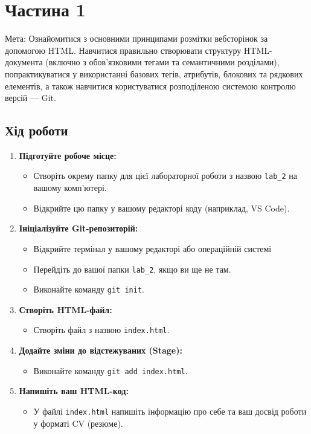 \documentclass[12pt, a4paper]{article}
\begin{document}

\section{Частина 1}
Мета: Ознайомитися з основними принципами розмітки вебсторінок за допомогою HTML. Навчитися правильно створювати структуру HTML-документа (включно з обов'язковими тегами та семантичними розділами), попрактикуватися у використанні базових тегів, атрибутів, блокових та рядкових елементів, а також навчитися користуватися розподіленою системою контролю версій --- Git.
\subsection{Хід роботи}
\begin{enumerate}
	\item \textbf{Підготуйте робоче місце:}
		\begin{itemize}
			\item Створіть окрему папку для цієї лабораторної роботи з назвою \verb|lab_2| на вашому комп'ютері.
			\item Відкрийте цю папку у вашому редакторі коду (наприклад, VS Code).
		\end{itemize}
	\item \textbf{Ініціалізуйте Git-репозиторій:}
		\begin{itemize}
			\item Відкрийте термінал у вашому редакторі або операційній системі
			\item Перейдіть до вашої папки \verb|lab_2|, якщо ви ще не там.
			\item Виконайте команду \verb|git init|.
		\end{itemize}
	\item \textbf{Створіть HTML-файл:}
		\begin{itemize}
			\item Створіть файл з назвою \verb|index.html|.
		\end{itemize}
	\item \textbf{Додайте зміни до відстежуваних (Stage):}
		\begin{itemize}
			\item Виконайте команду \verb|git add index.html|.
		\end{itemize}
	\item \textbf{Напишіть ваш HTML-код:}
		\begin{itemize}
			\item У файлі \verb|index.html| напишіть інформацію про себе та ваш досвід роботи у форматі CV (резюме).

\end{itemize}
\end{enumerate}
\end{document}
